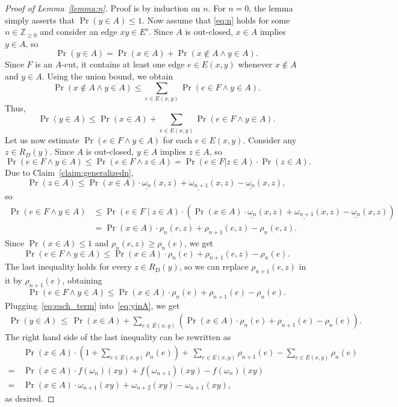 \documentclass[10pt]{article}
\numberwithin{equation}{subsection}
\theoremstyle{definition}
\begin{document}
	\begin{proof}[Proof of Lemma~\ref{lemma:n}]
		Proof is by induction on $n$. For $n = 0$, the lemma simply asserts that $\Pr(y \in A) \leq 1$. Now assume that \eqref{eq:n} holds for some $n \in \mathbb{Z}_{\geq 0}$ and consider an edge $xy \in E^s$. Since $A$ is out-closed, $x \in A$ implies $y \in A$, so
		$$
			\Pr(y \in A) = \Pr(x \in A) + \Pr(x \not \in A \wedge y \in A).
		$$
		Since $F$ is an $A$-cut, it contains at least one edge $e \in E(x, y)$ whenever $x \not \in A$ and $y \in A$. Using the union bound, we obtain
		$$
		\Pr(x \not \in A \wedge y \in A) \leq \sum_{e \in E(x,y)} \Pr(e \in F \wedge y \in A).
		$$
		Thus,
		\begin{equation}\label{eq:yinA}
		\Pr(y \in A) \leq \Pr(x \in A) + \sum_{e \in E(x,y)} \Pr(e \in F \wedge y \in A).
		\end{equation}
		Let us now estimate $\Pr(e \in F \wedge y \in A)$ for each $e \in E(x,y)$. Consider any $z \in R_D(y)$. Since $A$ is out-closed,  $y \in A$ implies $z \in A$, so
		$$
		\Pr(e \in F \wedge y \in A) \leq \Pr(e \in F \wedge z \in A) = \Pr(e \in F \vert z \in A) \cdot \Pr(z \in A).
		$$
		Due to Claim~\ref{claim:generalizedn},
		$$
		\Pr\left(z \in A\right) \leq \Pr(x \in A) \cdot \underline{\omega_n}\left(x, z\right) + \underline{\omega_{n+1}}\left(x, z\right) - \underline{\omega_n}\left(x, z\right),
		$$
		so
		\begin{align*}
		\Pr(e \in F \wedge y \in A) &\leq \Pr\left(e \in F\middle\vert z \in A\right)\cdot \left(\Pr(x \in A) \cdot \underline{\omega_n}\left(x, z\right) + \underline{\omega_{n+1}}\left(x, z\right) - \underline{\omega_n}\left(x, z\right)\right) \\
		&= \Pr(x \in A) \cdot \rho_n(e, z) + \rho_{n+1}(e,z) - \rho_n(e, z).
		\end{align*}
		Since $\Pr(x \in A) \leq 1$ and
		$
		\rho_n(e,z) \geq \rho_n(e)
		$,
		we get
		$$
		\Pr(e \in F \wedge y \in A) \leq \Pr(x \in A) \cdot \rho_n(e) + \rho_{n+1}(e,z) - \rho_n(e).
		$$
		The last inequality holds for every $z\in R_D(y)$, so we can replace $\rho_{n+1}(e,z)$ in it by $\rho_{n+1}(e)$, obtaining
		\begin{equation}\label{eq:each_term}
		\Pr(e \in F \wedge y \in A) \leq \Pr(x \in A) \cdot \rho_n(e) + \rho_{n+1}(e) - \rho_n(e).
		\end{equation}
		Plugging~\eqref{eq:each_term} into~\eqref{eq:yinA}, we get
		\begin{align*}
		\Pr(y\in A) \,\leq\, \Pr(x\in A) 
		+ \sum_{e \in E(x,y)} \left(\Pr(x \in A) \cdot \rho_n(e) + \rho_{n+1}(e) - \rho_n(e)\right).
		\end{align*}
		The right hand side of the last inequality can be rewritten as
		\begin{align*}
		&\Pr(x \in A) \cdot \left(1 + \sum_{e \in E(x,y)} \rho_n(e)\right)
		+\, \sum_{e \in E(x,y)} \rho_{n+1}(e) - \sum_{e \in E(x,y)} \rho_{n}(e)\\
		=\,&\Pr(x \in A) \cdot f(\omega_{n})(xy) + f(\omega_{n+1})(xy) - f(\omega_{n})(xy)\\
		=\,& \Pr(x \in A) \cdot \omega_{n+1}(xy) + \omega_{n+2}(xy) - \omega_{n+1}(xy),
		\end{align*}
		as desired.
	\end{proof}
	
\end{document}
